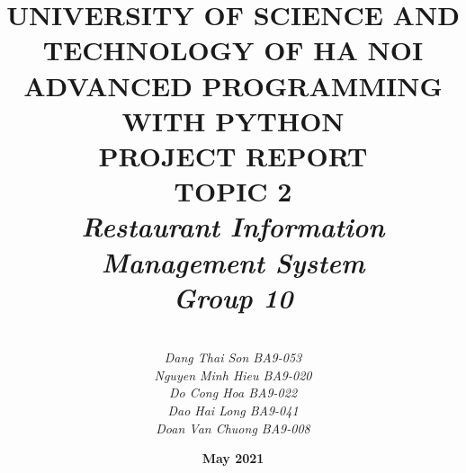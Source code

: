 \title{
\bf
UNIVERSITY OF SCIENCE AND TECHNOLOGY OF HA NOI 
\\ADVANCED PROGRAMMING WITH PYTHON
\\PROJECT REPORT
\\TOPIC 2
\it
\\Restaurant Information Management System
\vspace{1.5cm}
\bf
\\ Group 10}
\author{
\it
\\Dang Thai Son BA9-053
\it
\\ Nguyen Minh Hieu BA9-020
\it
\\ Do Cong Hoa BA9-022 
\it
\\ Dao Hai Long BA9-041 
\it
\\ Doan Van Chuong BA9-008}
\date{
\bf
May 2021}